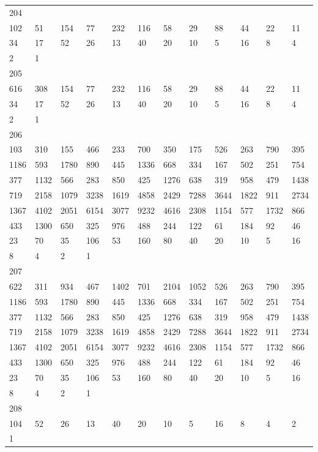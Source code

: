 \begin{longtable}{llllllllllll}
204&&&&&&&&&&&\\
102& 51& 154& 77& 232& 116& 58& 29& 88& 44& 22& 11\\
34& 17& 52& 26& 13& 40& 20& 10& 5& 16& 8& 4\\
2& 1& \\

205&&&&&&&&&&&\\
616& 308& 154& 77& 232& 116& 58& 29& 88& 44& 22& 11\\
34& 17& 52& 26& 13& 40& 20& 10& 5& 16& 8& 4\\
2& 1& \\

206&&&&&&&&&&&\\
103& 310& 155& 466& 233& 700& 350& 175& 526& 263& 790& 395\\
1186& 593& 1780& 890& 445& 1336& 668& 334& 167& 502& 251& 754\\
377& 1132& 566& 283& 850& 425& 1276& 638& 319& 958& 479& 1438\\
719& 2158& 1079& 3238& 1619& 4858& 2429& 7288& 3644& 1822& 911& 2734\\
1367& 4102& 2051& 6154& 3077& 9232& 4616& 2308& 1154& 577& 1732& 866\\
433& 1300& 650& 325& 976& 488& 244& 122& 61& 184& 92& 46\\
23& 70& 35& 106& 53& 160& 80& 40& 20& 10& 5& 16\\
8& 4& 2& 1& \\

207&&&&&&&&&&&\\
622& 311& 934& 467& 1402& 701& 2104& 1052& 526& 263& 790& 395\\
1186& 593& 1780& 890& 445& 1336& 668& 334& 167& 502& 251& 754\\
377& 1132& 566& 283& 850& 425& 1276& 638& 319& 958& 479& 1438\\
719& 2158& 1079& 3238& 1619& 4858& 2429& 7288& 3644& 1822& 911& 2734\\
1367& 4102& 2051& 6154& 3077& 9232& 4616& 2308& 1154& 577& 1732& 866\\
433& 1300& 650& 325& 976& 488& 244& 122& 61& 184& 92& 46\\
23& 70& 35& 106& 53& 160& 80& 40& 20& 10& 5& 16\\
8& 4& 2& 1& \\

208&&&&&&&&&&&\\
104& 52& 26& 13& 40& 20& 10& 5& 16& 8& 4& 2\\
1& \\


\end{longtable}

